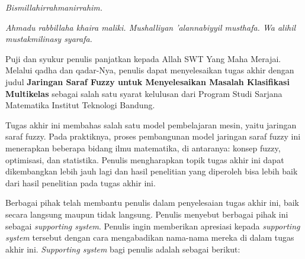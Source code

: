\begin{terimakasih}
\noindent \textit{Bismillahirrahmanirrahim.}

\noindent \textit{Ahmadu rabbillaha khaira maliki. Mushalliyan 'alannabiyyil musthafa. Wa alihil mustakmilinasy syarafa.}

\noindent Puji dan syukur penulis panjatkan kepada Allah SWT Yang Maha Merajai. Melalui qadha dan qadar-Nya, penulis dapat menyelesaikan tugas akhir dengan judul \textbf{Jaringan Saraf Fuzzy untuk Menyelesaikan Masalah Klasifikasi Multikelas} sebagai salah satu syarat kelulusan dari Program Studi Sarjana Matematika Institut Teknologi Bandung.

\noindent Tugas akhir ini membahas salah satu model pembelajaran mesin, yaitu jaringan saraf fuzzy. Pada praktiknya, proses pembangunan model jaringan saraf fuzzy ini menerapkan beberapa bidang ilmu matematika, di antaranya: konsep fuzzy, optimisasi, dan statistika. Penulis mengharapkan topik tugas akhir ini dapat dikembangkan lebih jauh lagi dan hasil penelitian yang diperoleh bisa lebih baik dari hasil penelitian pada tugas akhir ini.

\noindent Berbagai pihak telah membantu penulis dalam penyelesaian tugas akhir ini, baik secara langsung maupun tidak langsung. Penulis menyebut berbagai pihak ini sebagai \textit{supporting system}. Penulis ingin memberikan apresiasi kepada \textit{supporting system} tersebut dengan cara mengabadikan nama-nama mereka di dalam tugas akhir ini. \textit{Supporting system} bagi penulis adalah sebagai berikut:


\end{terimakasih}
